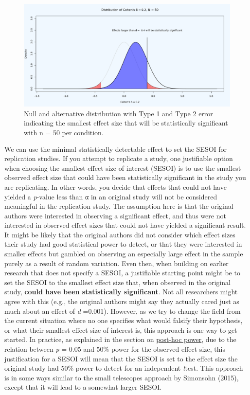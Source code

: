 \documentclass[
  oneside]{book}
\begin{document}
\begin{figure}

{\centering \includegraphics[width=1\linewidth]{images/dpplot502} 

}

\caption{Null and alternative distribution with Type 1 and Type 2 error indicating the smallest effect size that will be statistically significant with n = 50 per condition.}\label{fig:distpowerplot2}
\end{figure}

We can use the minimal statistically detectable effect to set the SESOI for replication studies. If you attempt to replicate a study, one justifiable option when choosing the smallest effect size of interest (SESOI) is to use the smallest observed effect size that could have been statistically significant in the study you are replicating. In other words, you decide that effects that could not have yielded a \emph{p}-value less than α in an original study will not be considered meaningful in the replication study. The assumption here is that the original authors were interested in observing a significant effect, and thus were not interested in observed effect sizes that could not have yielded a significant result. It might be likely that the original authors did not consider which effect sizes their study had good statistical power to detect, or that they were interested in smaller effects but gambled on observing an especially large effect in the sample purely as a result of random variation. Even then, when building on earlier research that does not specify a SESOI, a justifiable starting point might be to set the SESOI to the smallest effect size that, when observed in the original study, \textbf{could have been statistically significant}. Not all researchers might agree with this (e.g., the original authors might say they actually cared just as much about an effect of \emph{d} =0.001). However, as we try to change the field from the current situation where no one specifies what would falsify their hypothesis, or what their smallest effect size of interest is, this approach is one way to get started. In practice, as explained in the section on \protect\hyperlink{posthoc}{post-hoc power}, due to the relation between \emph{p} = 0.05 and 50\% power for the observed effect size, this justification for a SESOI will mean that the SESOI is set to the effect size the original study had 50\% power to detect for an independent \emph{t}test. This approach is in some ways similar to the small telescopes approach by Simonsohn (2015), except that it will lead to a somewhat larger SESOI.
\end{document}
